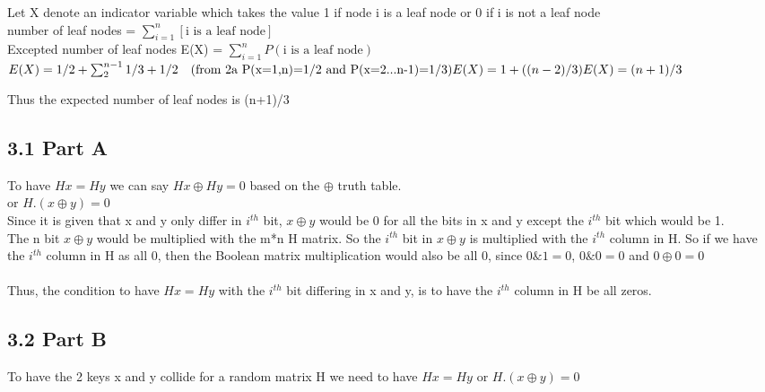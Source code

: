 \documentclass[12pt]{article}
\begin{document}
\vspace{10pt}
Let X denote an indicator variable which takes the value 1 if node i is a leaf node or 0 if i is not a leaf node \\
number of leaf nodes = \(\sum_{i=1}^n[\text{i is a leaf node}]\) \\ 
Excepted number of leaf nodes E(X) = \(\sum_{i=1}^nP(\text{i is a leaf node})\) \\
\(
E(X)=1/2+ \sum_2^{n-1}1/3 + 1/2 \quad \text{(from 2a P(x=1,n)=1/2 and P(x=2...n-1)=1/3)} \\
E(X)=1+((n-2)/3) \\
E(X)=(n+1)/3 \\
\)

Thus the expected number of leaf nodes is (n+1)/3

\subsection*{3.1 Part A} 

\vspace{10pt}

To have \(Hx=Hy\) we can say \(Hx\oplus Hy =0\) based on the \(\oplus\) truth table. \\
or \(H.(x\oplus y)=0\) \\
Since it is given that x and y only differ in \(i^{th}\) bit, \(x \oplus y\) would be 0 for all the bits in x and y except the \(i^{th}\) bit which would be 1. \\
The n bit \(x \oplus y\) would be multiplied with  the m*n H matrix. So the \(i^{th}\) bit in \(x \oplus y\) is multiplied with the \(i^{th}\) column in H. So if we have the \(i^{th}\) column in H as all 0, then the Boolean matrix multiplication would also be all 0, since \(0 \& 1=0\), \(0 \& 0=0\)  and \(0 \oplus 0=0\)
\\ \\
Thus, the condition to have \(Hx=Hy\) with the \(i^{th}\) bit differing in x and y, is to have the \(i^{th}\) column in H be all zeros. 

\subsection*{3.2 Part B} 

\vspace{10pt}

To have the 2 keys x and y collide for a random matrix H we need to have \(Hx=Hy\) or \(H.(x\oplus y)=0\) \\
\end{document}
